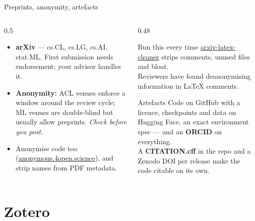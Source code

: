 \documentclass[aspectratio=169,11pt]{beamer}
\newcommand{\lnk}[2]{\href{#1}{\color{brandlight}\underline{#2}}}
\newcommand{\key}[1]{\textbf{\color{brand}#1}}
\begin{document}
\begin{frame}{Preprints, anonymity, artefacts}
\begin{columns}[T]
\begin{column}{0.5\textwidth}
\begin{itemize}
  \item \key{arXiv} --- cs.CL, cs.LG, cs.AI, stat.ML. First submission needs
        endorsement; your advisor handles it.
  \item \key{Anonymity:} ACL venues enforce a window around the review cycle;
        ML venues are double-blind but usually allow preprints. \emph{Check
        before you post.}
  \item Anonymise code too
        (\lnk{https://anonymous.4open.science}{anonymous.4open.science}), and
        strip names from PDF metadata.
\end{itemize}
\end{column}
\begin{column}{0.48\textwidth}
\begin{block}{Run this every time}
\footnotesize
\lnk{https://github.com/google-research/arxiv-latex-cleaner}{arxiv-latex-cleaner}
strips comments, unused files and bloat.\\[3pt]
Reviewers have found deanonymising information in LaTeX comments.
\end{block}
\begin{block}{Artefacts}
\footnotesize
Code on GitHub with a licence, checkpoints and data on Hugging Face, an exact
environment spec --- and an \key{ORCID} on everything.\\[3pt]
A \key{CITATION.cff} in the repo and a Zenodo DOI per release make the code
citable on its own.
\end{block}
\end{column}
\end{columns}
\end{frame}

\section{Zotero}
\end{document}
